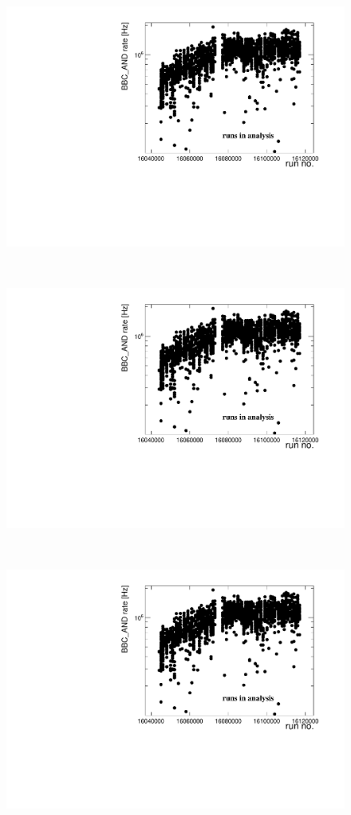 \begin{figure}[H]
	\centering
	\parbox{0.495\textwidth}{
		\centering
		\includegraphics[width=\linewidth,page=9]{graphics/systematicsEfficiency/bbc_and/Out.pdf}\\
	}~
	\parbox{0.495\textwidth}{
		\centering
		\includegraphics[width=\linewidth,page=10]{graphics/systematicsEfficiency/bbc_and/Out.pdf}\\
	}\\
	\parbox{0.495\textwidth}{
		\centering
		\includegraphics[width=\linewidth,page=11]{graphics/systematicsEfficiency/bbc_and/Out.pdf}\\
}
\end{figure}
